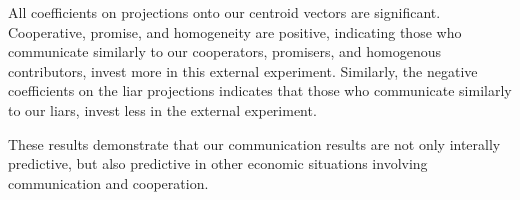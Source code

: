 \documentclass[12pt,letterpaper,english]{article}
\begin{document}
\begin{table}
    
    \caption{External regression of investment on communication projections.}
    \label{table:hanaki_external_validation_inv}
\end{table}

All coefficients on projections onto our centroid vectors are significant. Cooperative, promise,
and homogeneity are positive, indicating those who communicate similarly to our cooperators, promisers, and
homogenous contributors, invest more in this external experiment. Similarly, the negative coefficients on the liar
projections indicates that those who communicate similarly to our liars, invest less in the external experiment.

These results demonstrate that our communication results are not only interally predictive, but also
predictive in other economic situations involving communication and cooperation.

\bigskip
\noindent{}
\bigskip
\end{document}
